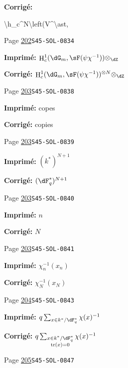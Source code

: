 \documentclass[oneside]{book}
\DeclareMathOperator{\h}{H}
\DeclareMathOperator{\tr}{tr}
\theoremstyle{sga-source}
\theoremstyle{sga-source-dash}
\theoremstyle{sga-source-dotdash}
\theoremstyle{sga-source-number-note-dash}
\theoremstyle{sga-source-note-number-dotdash}
\theoremstyle{sga-source-example-dotdash}
\theoremstyle{sga-source-inline-number}
\theoremstyle{sga-source-bare-number}
\theoremstyle{sga-source}
\begin{document}
\begin{description}
\par\noindent\textbf{Corrigé:} {\footnotesize\ttfamily\raggedright \textbackslash{}\allowbreak{}h\_\allowbreak{}c\textasciicircum{}\allowbreak{}N\textbackslash{}\allowbreak{}left(\allowbreak{}V\textasciicircum{}\allowbreak{}\textbackslash{}\allowbreak{}ast,\allowbreak{}\par}
\smallskip
\item[\hypertarget{apparatus:FR-0189}{189}] Page \hyperlink{printpage:fr:202}{202}\quad\texttt{S45-SOL-0834}
\par\noindent\textbf{Imprimé:} \(\h_c^1(\dG_m,\sF(\psi\chi^{-1})) \otimes_\dZ\)
\par\noindent\textbf{Corrigé:} \(\h_c^1(\dG_m,\sF(\psi\chi^{-1}))^{\otimes N} \otimes_\dZ\)
\smallskip
\item[\hypertarget{apparatus:FR-0190}{190}] Page \hyperlink{printpage:fr:203}{203}\quad\texttt{S45-SOL-0838}
\par\noindent\textbf{Imprimé:} copes
\par\noindent\textbf{Corrigé:} copies
\smallskip
\item[\hypertarget{apparatus:FR-0191}{191}] Page \hyperlink{printpage:fr:203}{203}\quad\texttt{S45-SOL-0839}
\par\noindent\textbf{Imprimé:} \((k^\ast)^{N+1}\)
\par\noindent\textbf{Corrigé:} \((\dF_q^\ast)^{N+1}\)
\smallskip
\item[\hypertarget{apparatus:FR-0192}{192}] Page \hyperlink{printpage:fr:203}{203}\quad\texttt{S45-SOL-0840}
\par\noindent\textbf{Imprimé:} \(n\)
\par\noindent\textbf{Corrigé:} \(N\)
\smallskip
\item[\hypertarget{apparatus:FR-0193}{193}] Page \hyperlink{printpage:fr:203}{203}\quad\texttt{S45-SOL-0841}
\par\noindent\textbf{Imprimé:} \(\chi_n^{-1}(x_n)\)
\par\noindent\textbf{Corrigé:} \(\chi_N^{-1}(x_N)\)
\smallskip
\item[\hypertarget{apparatus:FR-0194}{194}] Page \hyperlink{printpage:fr:204}{204}\quad\texttt{S45-SOL-0843}
\par\noindent\textbf{Imprimé:} \(q\sum_{x\in k^\ast/\dF_q^\ast} \chi(x)^{-1}\)
\par\noindent\textbf{Corrigé:} \(q\sum_{\substack{x\in k^\ast/\dF_q^\ast\\\tr(x)=0}} \chi(x)^{-1}\)
\smallskip
\item[\hypertarget{apparatus:FR-0195}{195}] Page \hyperlink{printpage:fr:205}{205}\quad\texttt{S45-SOL-0847}

\end{description}
\end{document}
